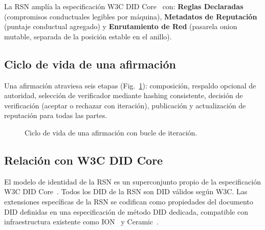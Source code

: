 \documentclass[11pt,a4paper,twocolumn]{article}
\begin{document}
La RSN amplía la especificación W3C DID Core~\cite{did2022} con: \textbf{Reglas Declaradas} (compromisos conductuales legibles por máquina), \textbf{Metadatos de Reputación} (puntaje conductual agregado) y \textbf{Enrutamiento de Red} (pasarela onion mutable, separada de la posición estable en el anillo).

\subsection{Ciclo de vida de una afirmación}

Una afirmación atraviesa seis etapas (Fig.~\ref{fig:lifecycle}): composición, respaldo opcional de autoridad, selección de verificador mediante hashing consistente, decisión de verificación (aceptar o rechazar con iteración), publicación y actualización de reputación para todas las partes.

\begin{figure}[ht]
\centering
{}
\caption{Ciclo de vida de una afirmación con bucle de iteración.}
\label{fig:lifecycle}
\end{figure}

\subsection{Relación con W3C DID Core}

El modelo de identidad de la RSN es un superconjunto propio de la especificación W3C DID Core~\cite{did2022}. Todos los DID de la RSN son DID válidos según W3C. Las extensiones específicas de la RSN se codifican como propiedades del documento DID definidas en una especificación de método DID dedicada, compatible con infraestructura existente como ION~\cite{buchner2021} y Ceramic~\cite{ceramic2023}.
\end{document}
